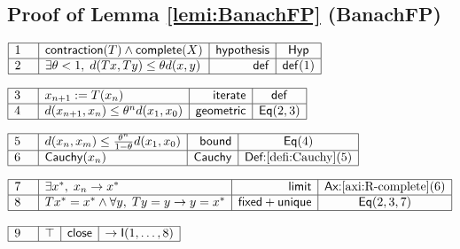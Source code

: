 \documentclass[11pt,reqno]{amsart}
\begin{document}
	\subsection*{Proof of Lemma \protect\ref{lemi:BanachFP} (\textsf{BanachFP})}
	\noindent$\begin{array}{|m{0.5cm}|l|r|c|}
	\hline
	1 & \mathsf{contraction}(T)\wedge\mathsf{complete}(X) & \mathsf{hypothesis} & \mathsf{Hyp} \\ \hline
	2 & \exists\theta<1,\;d(Tx,Ty)\le\theta d(x,y) & \mathsf{def} & \mathsf{def}(1) \\ \hline
	\end{array}$
	\par\nointerlineskip\noindent$\begin{array}{|m{0.5cm}|l|r|c|}
	\hline
	3 & x_{n+1}:=T(x_{n}) & \mathsf{iterate} & \mathsf{def} \\ \hline
	4 & d(x_{n+1},x_{n})\le\theta^{n}d(x_{1},x_{0}) & \mathsf{geometric} & \mathsf{Eq}(2,3) \\ \hline
	\end{array}$
	\par\nointerlineskip\noindent$\begin{array}{|m{0.5cm}|l|r|c|}
	\hline
	5 & d(x_{n},x_{m})\le\tfrac{\theta^{n}}{1-\theta}d(x_{1},x_{0}) & \mathsf{bound} & \mathsf{Eq}(4) \\ \hline
	6 & \mathsf{Cauchy}(x_{n}) & \mathsf{Cauchy} & \textsf{Def:}\ref{defi:Cauchy}(5) \\ \hline
	\end{array}$
	\par\nointerlineskip\noindent$\begin{array}{|m{0.5cm}|l|r|c|}
	\hline
	7 & \exists x^{*},\;x_{n}\to x^{*} & \mathsf{limit} & \textsf{Ax:}\ref{axi:R-complete}(6) \\ \hline
	8 & Tx^{*}=x^{*}\wedge\forall y,\;Ty=y\to y=x^{*} & \mathsf{fixed+unique} & \mathsf{Eq}(2,3,7) \\ \hline
	\end{array}$
	\par\nointerlineskip\noindent$\begin{array}{|m{0.5cm}|l|r|c|}
	\hline
	9 & \top & \mathsf{close} & \to\mathsf{I}(1,\dots,8) \\ \hline
	\end{array}$
	\medskip
	
\end{document}
